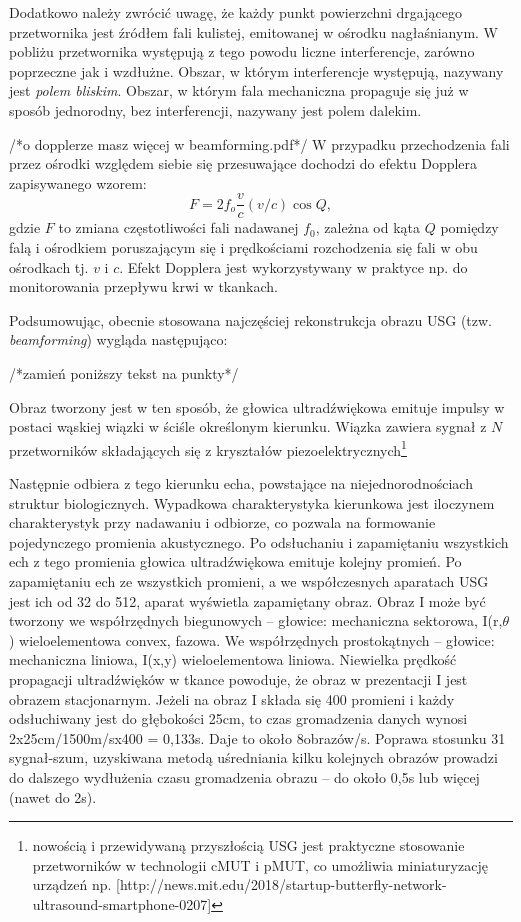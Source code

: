 Dodatkowo należy zwrócić uwagę, że każdy punkt powierzchni drgającego przetwornika jest źródłem fali kulistej, emitowanej w ośrodku nagłaśnianym. W pobliżu przetwornika występują z tego powodu liczne interferencje, zarówno poprzeczne jak i wzdłużne. Obszar, w którym interferencje występują, nazywany jest \textit{polem bliskim}. Obszar, w którym fala mechaniczna propaguje się już w sposób jednorodny, bez interferencji, nazywany jest polem dalekim. 

/*o dopplerze masz więcej w beamforming.pdf*/
W przypadku przechodzenia fali przez ośrodki względem siebie się przesuwające dochodzi do efektu Dopplera zapisywanego wzorem:
\begin{equation}
F = 2 f_o\frac{v}{c}(v/c)\cos{Q},
\end{equation} 
gdzie $F$ to zmiana częstotliwości fali nadawanej $f_0$, zależna od kąta $Q$ pomiędzy falą i ośrodkiem poruszającym się i prędkościami rozchodzenia się fali w obu ośrodkach tj. $v$ i $c$. Efekt Dopplera jest wykorzystywany w praktyce np. do monitorowania przepływu krwi w tkankach.

Podsumowując, obecnie stosowana najczęściej rekonstrukcja obrazu USG (tzw. \textit{beamforming}) wygląda następująco:

/*zamień poniższy tekst na punkty*/

Obraz tworzony jest w ten sposób, że głowica ultradźwiękowa emituje impulsy w
postaci wąskiej wiązki w ściśle określonym kierunku. Wiązka zawiera sygnał z $N$ przetworników składających się z kryształów piezoelektrycznych\footnote{nowością i przewidywaną przyszłością USG jest praktyczne stosowanie przetworników w technologii cMUT i pMUT, co umożliwia miniaturyzację urządzeń np. [http://news.mit.edu/2018/startup-butterfly-network-ultrasound-smartphone-0207]} 

Następnie odbiera z tego kierunku echa, powstające na niejednorodnościach struktur biologicznych. Wypadkowa charakterystyka kierunkowa jest iloczynem charakterystyk przy nadawaniu i odbiorze, co pozwala na formowanie pojedynczego promienia akustycznego. Po odsłuchaniu i zapamiętaniu wszystkich ech z tego promienia
głowica ultradźwiękowa emituje kolejny promień. Po zapamiętaniu ech ze wszystkich
promieni, a we współczesnych aparatach USG jest ich od 32 do 512, aparat wyświetla zapamiętany obraz. Obraz I może być tworzony we współrzędnych biegunowych – głowice: mechaniczna sektorowa,
I(r,$\theta$) wieloelementowa convex, fazowa.
We współrzędnych prostokątnych – głowice: mechaniczna liniowa,
I(x,y) wieloelementowa liniowa. Niewielka prędkość propagacji ultradźwięków w tkance powoduje, że obraz w
prezentacji I jest obrazem stacjonarnym. Jeżeli na obraz I składa się 400 promieni i
każdy odsłuchiwany jest do głębokości 25cm, to czas gromadzenia danych wynosi
2x25cm/1500m/sx400 = 0,133s. Daje to około 8obrazów/s. Poprawa stosunku
31
sygnał-szum, uzyskiwana metodą uśredniania kilku kolejnych obrazów prowadzi do
dalszego wydłużenia czasu gromadzenia obrazu – do około 0,5s lub więcej (nawet
do 2s). 

